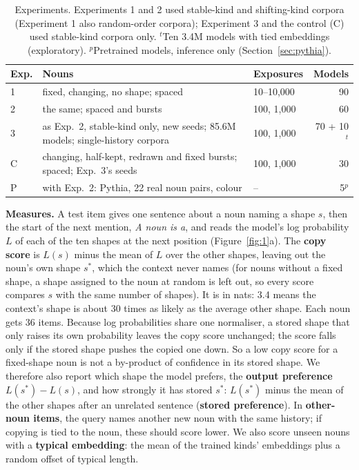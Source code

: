 \documentclass{article}
\begin{document}
\begin{table}[t]
\centering
\small
\setlength{\tabcolsep}{2.5pt}
\begin{tabular}{@{}l>{\raggedright\arraybackslash}p{}lr@{}}
\toprule
Exp. & Nouns & Exposures & Models \\
\midrule
1 & fixed, changing, no shape; spaced & 10--10,000 & 90 \\
2 & the same; spaced and bursts & 100, 1,000 & 60 \\
3 & as Exp.~2, stable-kind only, new seeds; 85.6M models; single-history corpora & 100, 1,000 & 70 + 10$^t$ \\
C & changing, half-kept, redrawn and fixed bursts; spaced; Exp.~3's seeds & 100, 1,000 & 30 \\
P & with Exp.~2: Pythia, 22 real noun pairs, colour & -- & 5$^p$ \\
\bottomrule
\end{tabular}
\caption{Experiments. Experiments 1 and 2 used stable-kind and shifting-kind corpora (Experiment 1 also random-order corpora); Experiment 3 and the control (C) used stable-kind corpora only. $^t$Ten 3.4M models with tied embeddings (exploratory). $^p$Pretrained models, inference only (Section~\ref{sec:pythia}).}
\label{tab:exps}
\end{table}

\textbf{Measures.} A test item gives one sentence about a noun naming a shape $s$, then the start of the next mention, \emph{A \textit{noun} is a}, and reads the model's log probability $L$ of each of the ten shapes at the next position (Figure~\ref{fig:1}a). The \textbf{copy score} is $L(s)$ minus the mean of $L$ over the other shapes, leaving out the noun's own shape $s^*$, which the context never names (for nouns without a fixed shape, a shape assigned to the noun at random is left out, so every score compares $s$ with the same number of shapes). It is in nats: 3.4 means the context's shape is about 30 times as likely as the average other shape. Each noun gets 36 items. Because log probabilities share one normaliser, a stored shape that only raises its own probability leaves the copy score unchanged; the score falls only if the stored shape pushes the copied one down. So a low copy score for a fixed-shape noun is not a by-product of confidence in its stored shape. We therefore also report which shape the model prefers, the \textbf{output preference} $L(s^*) - L(s)$, and how strongly it has stored $s^*$: $L(s^*)$ minus the mean of the other shapes after an unrelated sentence (\textbf{stored preference}). In \textbf{other-noun items}, the query names another new noun with the same history; if copying is tied to the noun, these should score lower. We also score unseen nouns with a \textbf{typical embedding}: the mean of the trained kinds' embeddings plus a random offset of typical length.
\end{document}
